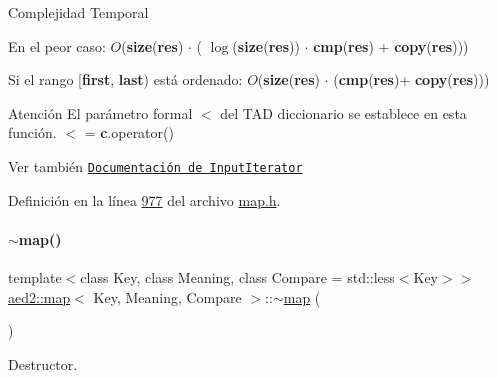 \begin{DoxyDescription}
\item[Complejidad Temporal]
\begin{DoxyItemize}
\item En el peor caso\+: $O$({\bfseries size}({\bfseries res}) $\cdot$ ( $\log$({\bfseries size}({\bfseries res})) $\cdot$ {\bfseries cmp}({\bfseries res}) + {\bfseries copy}({\bfseries res})))
\item Si el rango \mbox{[}{\bfseries first}, {\bfseries last}) está ordenado\+: $O$({\bfseries size}({\bfseries res}) $\cdot$ ({\bfseries cmp}({\bfseries res})+ {\bfseries copy}({\bfseries res}))) 
\end{DoxyItemize}
\end{DoxyDescription}

\begin{DoxyAttention}{Atención}
El parámetro formal $<$ del T\+AD diccionario se establece en esta función. $<$ = {\bfseries c}.operator()
\end{DoxyAttention}
\begin{DoxySeeAlso}{Ver también}
\href{http://en.cppreference.com/w/cpp/concept/InputIterator}{\tt Documentación de Input\+Iterator} 
\end{DoxySeeAlso}


Definición en la línea \hyperlink{map_8h_source_l00977}{977} del archivo \hyperlink{map_8h_source}{map.\+h}.

\mbox{\label{classaed2_1_1map_ab22c9a85c2dadbc286cd30e97069a8e6_ab22c9a85c2dadbc286cd30e97069a8e6}} 
\paragraph{\texorpdfstring{$\sim$map()}{~map()}}
{\footnotesize\ttfamily template$<$class Key, class Meaning, class Compare = std\+::less$<$\+Key$>$$>$ \\
\hyperlink{classaed2_1_1map}{aed2\+::map}$<$ Key, Meaning, Compare $>$\+::$\sim$\hyperlink{classaed2_1_1map}{map} (\begin{DoxyParamCaption}{ }\end{DoxyParamCaption})\hspace{0.3cm}{\ttfamily [inline]}}



Destructor. 

